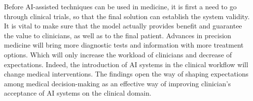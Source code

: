 Before \ac{AI}-assisted techniques can be used in medicine, it is first a need to go through clinical trials, so that the final solution can establish the system validity.
It is vital to make sure that the model actually provides benefit and guarantee the value to clinicians, as well as to the final patient.
Advances in precision medicine will bring more diagnostic tests and information with more treatment options.
Which will only increase the workload of clinicians and decrease of expectations.
Indeed, the introduction of \ac{AI} systems in the clinical workflow will change medical interventions.
The findings open the way of shaping expectations among medical decision-making as an effective way of improving clinician’s acceptance of \ac{AI} systems on the clinical domain.